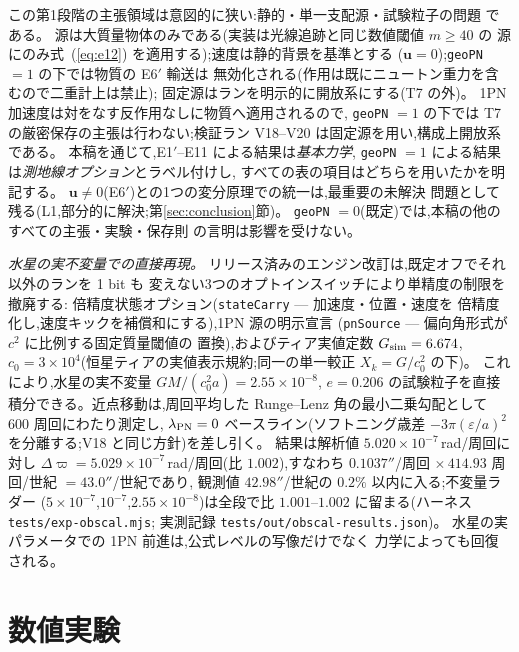 \documentclass[a4paper,10pt,twocolumn]{ltjsarticle}
\newcommand{\vect}[1]{\bm{#1}}
\newcommand{\Kt}{X_k}
\begin{document}
この第1段階の主張領域は意図的に狭い:静的・単一支配源・試験粒子の問題
である。
源は大質量物体のみである(実装は光線追跡と同じ数値閾値 $m \ge 40$ の
源にのみ式~(\ref{eq:e12}) を適用する);速度は静的背景を基準とする
($\vect{u} = 0$);\texttt{geoPN} $= 1$ の下では物質の E6$'$ 輸送は
無効化される(作用は既にニュートン重力を含むので二重計上は禁止);
固定源はランを明示的に開放系にする(T7 の外)。
1PN 加速度は対をなす反作用なしに物質へ適用されるので,
\texttt{geoPN} $= 1$ の下では T7 の厳密保存の主張は行わない;検証ラン
V18--V20 は固定源を用い,構成上開放系である。
本稿を通じて,E1$'$--E11 による結果は\emph{基本力学},
\texttt{geoPN} $= 1$ による結果は\emph{測地線オプション}とラベル付けし,
すべての表の項目はどちらを用いたかを明記する。
$\vect{u} \ne 0$(E6$'$)との1つの変分原理での統一は,最重要の未解決
問題として残る(L1,部分的に解決;第\ref{sec:conclusion}節)。
\texttt{geoPN} $= 0$(既定)では,本稿の他のすべての主張・実験・保存則
の言明は影響を受けない。

\emph{水星の実不変量での直接再現。}
リリース済みのエンジン改訂は,既定オフでそれ以外のランを 1 bit も
変えない3つのオプトインスイッチにより単精度の制限を撤廃する:
倍精度状態オプション(\texttt{stateCarry} — 加速度・位置・速度を
倍精度化し,速度キックを補償和にする),1PN 源の明示宣言
(\texttt{pnSource} — 偏向角形式が $c^2$ に比例する固定質量閾値の
置換),およびティア実値定数 $G_{\rm sim} = 6.674$,
$c_0 = 3\times10^4$(恒星ティアの実値表示規約;同一の単一較正
$\Kt = G/c_0^2$ の下)。
これにより,水星の実不変量 $GM/(c_0^2a) = 2.55\times10^{-8}$,
$e = 0.206$ の試験粒子を直接積分できる。近点移動は,周回平均した
Runge--Lenz 角の最小二乗勾配として 600 周回にわたり測定し,
$\lambda_{\rm PN} = 0$ ベースライン(ソフトニング歳差
$-3\pi(\varepsilon/a)^2$ を分離する;V18 と同じ方針)を差し引く。
結果は解析値 $5.020\times10^{-7}$\,rad/周回に対し
$\Delta\varpi = 5.029\times10^{-7}$\,rad/周回(比 $1.002$),すなわち
$0.1037''$/周回 $\times\,414.93$ 周回/世紀 $= 43.0''$/世紀であり,
観測値 $42.98''$/世紀の $0.2\%$ 以内に入る;不変量ラダー
($5\times10^{-7}$,$10^{-7}$,$2.55\times10^{-8}$)は全段で比
$1.001$--$1.002$ に留まる(ハーネス \texttt{tests/exp-obscal.mjs};
実測記録 \texttt{tests/out/obscal-results.json})。
水星の実パラメータでの 1PN 前進は,公式レベルの写像だけでなく
力学によっても回復される。

\section{数値実験}
\label{sec:experiments}
\end{document}
